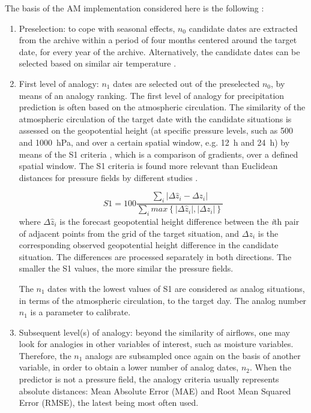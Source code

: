 \documentclass{ametsoc}
\begin{document}
The basis of the AM implementation considered here is the following \citep[same approach as][]{Guilbaud1997, Bontron2005, Marty2012, Horton2012, Radanovics2013, Chardon2014, Dayon2015, BenDaoud2016}:

\begin{enumerate}
	\item Preselection: to cope with seasonal effects, $n_{0}$ candidate dates are extracted from the archive within a period of four months centered around the target date, for every year of the archive. Alternatively, the candidate dates can be selected based on similar air temperature \citep[see][]{BenDaoud2016}.
	
	\item First level of analogy: $n_{1}$ dates are selected out of the preselected $n_{0}$, by means of an analogy ranking. The first level of analogy for precipitation prediction is often based on the atmospheric circulation. The similarity of the atmospheric circulation of the target date with the candidate situations is assessed on the geopotential height (at specific pressure levels, such as 500 and 1000~hPa, and over a certain spatial window, e.g. 12~h and 24~h) by means of the S1 criteria \citep[eq. (\ref{eq:S1}), ][]{Teweles1954, Drosdowsky2003}, which is a comparison of gradients, over a defined spatial window. The S1 criteria is found more relevant than Euclidean distances for pressure fields by different studies \citep{Wilson1980, Woodcock1980, Guilbaud1998, Bontron2004}.
	
	\begin{equation}
	\label{eq:S1}
	S1=100 \frac {\displaystyle \sum_{i} \vert \Delta\hat{z}_{i} - \Delta z_{i} \vert}
	{\displaystyle \sum_{i} max\left\lbrace \vert \Delta\hat{z}_{i} \vert , \vert \Delta z_{i} \vert \right\rbrace }
	\end{equation}
	where $\Delta \hat{z}_{i}$ is the forecast geopotential height difference between the \textit{i}th pair of adjacent points from the grid of the target situation, and $\Delta z_{i}$ is the corresponding observed geopotential height difference in the candidate situation. The differences are processed separately in both directions. The smaller the S1 values, the more similar the pressure fields.
	
	The $n_{1}$ dates with the lowest values of S1 are considered as analog situations, in terms of the atmospheric circulation, to the target day. The analog number $n_{1}$ is a parameter to calibrate.
	
	\item Subsequent level(s) of analogy: beyond the similarity of airflows, one may look for analogies in other variables of interest, such as moisture variables. Therefore, the $n_{1}$ analogs are subsampled once again on the basis of another variable, in order to obtain a lower number of analog dates, $n_{2}$. When the predictor is not a pressure field, the analogy criteria usually represents absolute distances: Mean Absolute Error (MAE) and Root Mean Squared Error (RMSE), the latest being most often used.
	

\end{enumerate}
\end{document}
